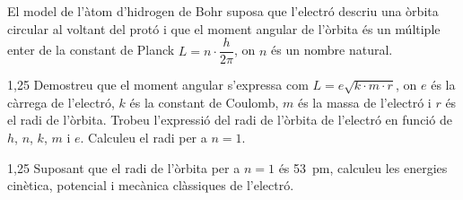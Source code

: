 El model de l'àtom d'hidrogen de Bohr suposa que l'electró descriu una òrbita circular al voltant del protó i que el moment angular de l'òrbita és un múltiple enter de la constant de Planck $L = n\cdot\dfrac{h}{2\pi}$, on $n$ és un nombre natural.

\begin{apartat}{1,25}
Demostreu que el moment angular s'expressa com $L = e\sqrt{k\cdot m\cdot r}$, on $e$ és la càrrega de l'electró, $k$ és la constant de Coulomb, $m$ és la massa de l'electró i $r$ és el radi de l'òrbita. Trobeu l'expressió del radi de l'òrbita de l'electró en funció de $h$, $n$, $k$, $m$ i $e$. Calculeu el radi per a $n = 1$.
\end{apartat}

\begin{apartat}{1,25}
Suposant que el radi de l'òrbita per a $n = 1$ és 53~pm, calculeu les energies cinètica, potencial i mecànica clàssiques de l'electró.
\end{apartat}

